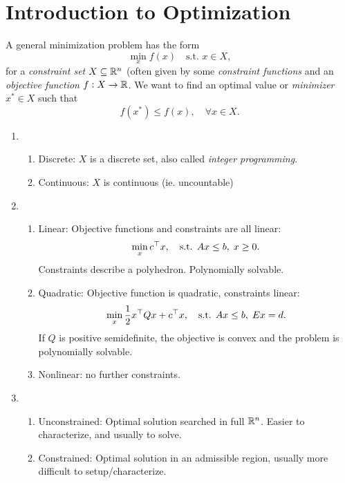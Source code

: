\documentclass{article}
\begin{document}
\section{Introduction to Optimization}


A general minimization problem has the form
\begin{equation*}
  \min_{x} f(x) \quad \text{s.t. } x \in X,
\end{equation*}
for a \emph{constraint set} \(X \subseteq \mathbb{R}^n\) (often given by some \emph{constraint functions}
and an \emph{objective function} \(f: X \to \mathbb{R}\).  We want to find an optimal value or
\emph{minimizer} \(x^* \in X\) such that
\begin{equation*}
  f(x^*) \leq f(x), \quad \forall x \in X.
\end{equation*}



\begin{enumerate}
\item
  \begin{enumerate}
  \item Discrete: \(X\) is a discrete set, also called \emph{integer programming}.
  \item Continuous: \(X\) is continuous (ie. uncountable)
  \end{enumerate}
\item
  \begin{enumerate}
  \item Linear: Objective functions and constraints are all linear:
    \begin{equation*}
      \min_x c^{\top} x, \quad\text{s.t. } Ax \leq b,\; x \geq 0.
    \end{equation*}
    Constraints describe a polyhedron.  Polynomially solvable.
  \item Quadratic: Objective function is quadratic, constraints linear:
    \begin{equation*}
      \min_x \frac{1}{2}x^{\top} Q x + c^{\top} x, \quad\text{s.t. } Ax \leq b,\; Ex = d.
    \end{equation*}
    If \(Q\) is positive semidefinite, the objective is convex and the problem is polynomially
    solvable.
  \item Nonlinear: no further constraints.
  \end{enumerate}
\item
  \begin{enumerate}
  \item Unconstrained: Optimal solution searched in full \(\mathbb{R}^n\). Easier to characterize, and
    usually to solve.
  \item Constrained: Optimal solution in an admissible region, usually more difficult to
    setup/characterize.
  \end{enumerate}
\end{enumerate}
\end{document}
